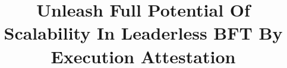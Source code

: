 \documentclass[10pt,sigconf,anonymous]{acmart}
\begin{document}
\title{Unleash Full Potential Of Scalability In Leaderless BFT By Execution Attestation}


\maketitle




\end{document}
